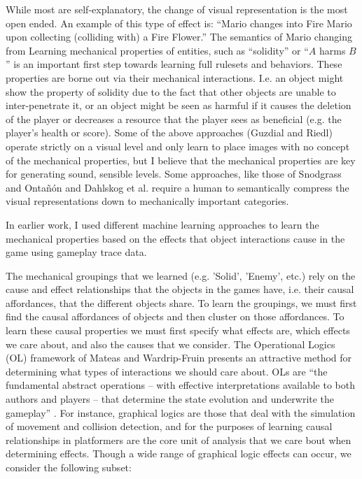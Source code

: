\documentclass[12pt]{report}
\begin{document}
While most are self-explanatory, the change of visual representation is the most open ended.  An example of this type of effect is: ``Mario changes into Fire Mario upon collecting (colliding with) a Fire Flower.'' The semantics of Mario changing from Learning mechanical properties of entities, such as ``solidity'' or ``$A$ harms $B$'' is an important first step towards learning full rulesets and behaviors. These properties are borne out via their mechanical interactions.  I.e. an object might show the property of solidity due to the fact that other objects are unable to inter-penetrate it, or an object might be seen as harmful if it causes the deletion of the player or decreases a resource that the player sees as beneficial (e.g. the player's health or score).  Some of the above approaches (Guzdial and Riedl) operate strictly on a visual level and only learn to place images with no concept of the mechanical properties, but I believe that the mechanical properties are key for generating sound, sensible levels.  Some approaches, like those of Snodgrass and Onta{\~n}{\'o}n and Dahlskog et al. require a human to semantically compress the visual representations down to mechanically important categories.  

In earlier work, I used different machine learning approaches to  learn the mechanical properties based on the effects that object interactions cause in the game using gameplay trace data. 

 The mechanical groupings that we learned (e.g. 'Solid', 'Enemy', etc.) rely on the cause and effect relationships that the objects in the games have, i.e. their causal affordances, that the different objects share.  To learn the groupings, we must first find the causal affordances of objects and then cluster on those affordances.  To learn these causal properties we must first specify what effects are, which effects we care about, and also the causes that we consider.  The Operational Logics (OL) framework of Mateas and Wardrip-Fruin \cite{OperationalLogics} presents an attractive method for determining what types of interactions we should care about.  OLs are ``the fundamental abstract operations -- with effective interpretations available to both authors and players -- that determine the state evolution and underwrite the gameplay'' \cite{OperationalLogics}.  For instance, graphical logics are those that deal with the simulation of movement and collision detection, and for the purposes of learning causal relationships in platformers are the core unit of analysis that we care bout when determining effects. Though a wide range of graphical logic effects can occur, we consider the following subset:
 
\end{document}
